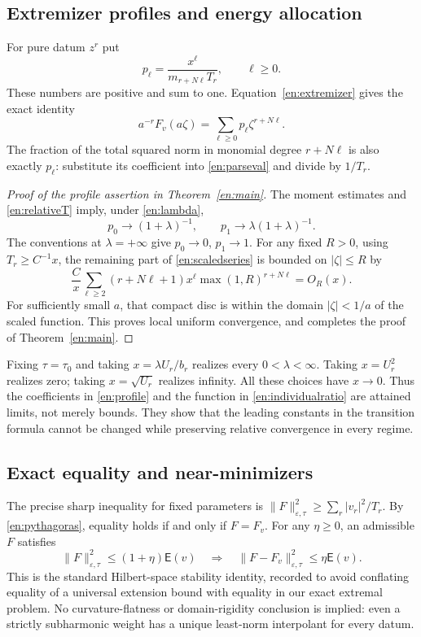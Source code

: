 \documentclass[12pt]{amsart}
\theoremstyle{definition}
\theoremstyle{remark}
\numberwithin{equation}{section}
\newcommand{\Cost}{\mathsf E}
\theoremstyle{definition}
\begin{document}
\subsection{Extremizer profiles and energy allocation}
For pure datum $z^r$ put
\begin{equation}\label{en:probabilities}
 p_\ell=\frac{x^\ell}{m_{r+N\ell}T_r},\qquad \ell\ge0.
\end{equation}
These numbers are positive and sum to one. Equation~\eqref{en:extremizer}
gives the exact identity
\begin{equation}\label{en:scaledseries}
 a^{-r}F_v(a\zeta)=\sum_{\ell\ge0}p_\ell\zeta^{r+N\ell}.
\end{equation}
The fraction of the total squared norm in monomial degree $r+N\ell$
is also exactly $p_\ell$: substitute its coefficient into
\eqref{en:parseval} and divide by $1/T_r$.

\begin{proof}[Proof of the profile assertion in Theorem~\ref{en:main}]
The moment estimates and \eqref{en:relativeT} imply, under
\eqref{en:lambda},
\[
 p_0\to(1+\lambda)^{-1},\qquad
 p_1\to\lambda(1+\lambda)^{-1}.
\]
The conventions at $\lambda=+\infty$ give $p_0\to0$, $p_1\to1$.
For any fixed $R>0$, using $T_r\ge C^{-1}x$, the remaining part
of \eqref{en:scaledseries} is bounded on $|\zeta|\le R$ by
\[
 \frac{C}{x}\sum_{\ell\ge2}
 (r+N\ell+1)x^\ell\max(1,R)^{r+N\ell}=O_R(x).
\]
For sufficiently small $a$, that compact disc is within the domain
$|\zeta|<1/a$ of the scaled function. This proves local uniform
convergence, and completes the proof of Theorem~\ref{en:main}.
\end{proof}

Fixing $\tau=\tau_0$ and taking $x=\lambda U_r/b_r$ realizes every
$0<\lambda<\infty$. Taking $x=U_r^2$ realizes zero; taking
$x=\sqrt{U_r}$ realizes infinity. All these choices have $x\to0$.
Thus the coefficients in \eqref{en:profile} and the function in
\eqref{en:individualratio} are attained limits, not merely bounds.
They show that the leading constants in the transition formula cannot
be changed while preserving relative convergence in every regime.

\subsection{Exact equality and near-minimizers}
The precise sharp inequality for fixed parameters is
$\|F\|_{\varepsilon,\tau}^2\ge\sum_r|v_r|^2/T_r$.
By \eqref{en:pythagoras}, equality holds if and only if $F=F_v$.
For any $\eta\ge0$, an admissible $F$ satisfies
\[
 \|F\|_{\varepsilon,\tau}^2\le(1+\eta)\Cost(v)
 \quad\Longrightarrow\quad
 \|F-F_v\|_{\varepsilon,\tau}^2\le\eta\Cost(v).
\]
This is the standard Hilbert-space stability identity, recorded to
avoid conflating equality of a universal extension bound with equality
in our exact extremal problem. No curvature-flatness or domain-rigidity
conclusion is implied: even a strictly subharmonic weight has a unique
least-norm interpolant for every datum.
\end{document}
